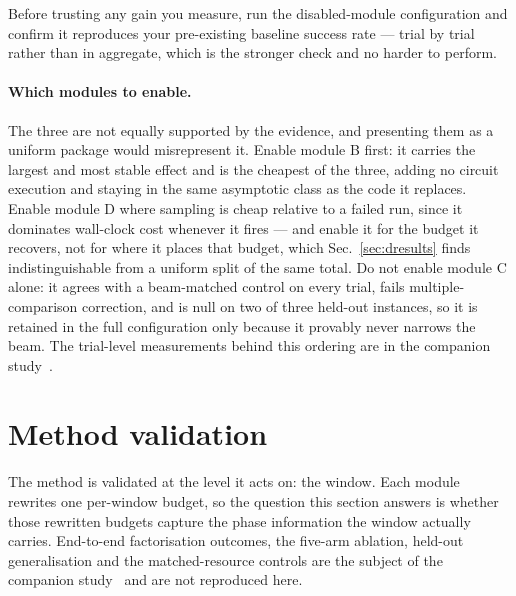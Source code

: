 \documentclass[final,5p,times,longtitle]{elsarticle}
\begin{document}
Before trusting any gain you measure, run the disabled-module
configuration and confirm it reproduces your pre-existing baseline
success rate --- trial by trial rather than in aggregate, which is the
stronger check and no harder to perform.


\paragraph{Which modules to enable.} The three are not equally supported by
the evidence, and presenting them as a uniform package would misrepresent
it. Enable module B first: it carries the largest and most stable effect
and is the cheapest of the three, adding no circuit execution and staying
in the same asymptotic class as the code it replaces. Enable module D where
sampling is cheap relative to a failed run, since it dominates wall-clock
cost whenever it fires --- and enable it for the budget it recovers, not
for where it places that budget, which Sec.~\ref{sec:dresults} finds
indistinguishable from a uniform split of the same total. Do not enable
module C alone: it agrees with a beam-matched control on every trial, fails
multiple-comparison correction, and is null on two of three held-out
instances, so it is retained in the full configuration only because it
provably never narrows the beam. The trial-level measurements behind this
ordering are in the companion study~\cite{companion}.


\section{Method validation}
\label{sec:validation}

The method is validated at the level it acts on: the window. Each module
rewrites one per-window budget, so the question this section answers is
whether those rewritten budgets capture the phase information the window
actually carries. End-to-end factorisation outcomes, the five-arm ablation,
held-out generalisation and the matched-resource controls are the subject
of the companion study~\cite{companion} and are not reproduced here.
\end{document}
